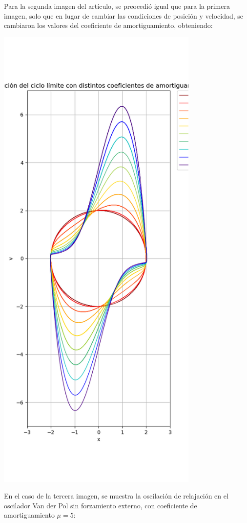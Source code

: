 \documentclass{article}
\begin{document}
Para la segunda imagen del artículo, se preocedió igual que para la primera imagen, solo que en lugar de cambiar las condiciones de posición y velocidad, se cambiaron los valores del coeficiente de amortiguamiento, obteniendo:
\begin{center}
  \includegraphics[width=0.75\textwidth]{Coeficientes.png}
\end{center}
En el caso de la tercera imagen, se muestra la oscilación de relajación en el oscilador Van der Pol sin forzamiento externo, con coeficiente de amortiguamiento $\mu=5$:
\end{document}
